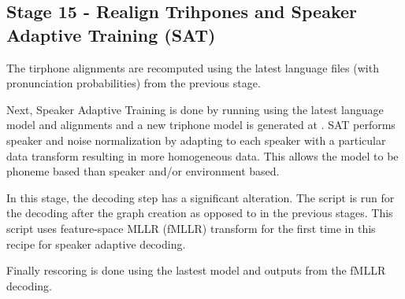 \subsection{ Stage 15 - Realign Trihpones and Speaker Adaptive Training (SAT) }
The tirphone alignments are recomputed using the latest language files (with pronunciation probabilities) from the previous stage.

Next, Speaker Adaptive Training is done by running  using the latest language model and alignments and a new triphone model is generated at . SAT performs speaker and noise normalization by adapting to each speaker with a particular data transform resulting in more homogeneous data. This allows the model to be phoneme based than speaker and/or environment based.

In this stage, the decoding step has a significant alteration. The script  is run for the decoding after the graph creation as opposed to  in the previous stages. This script uses feature-space MLLR (fMLLR)\cite{fmllr} transform for the first time in this recipe for speaker adaptive decoding.

Finally rescoring is done using the lastest model and outputs from the fMLLR decoding.